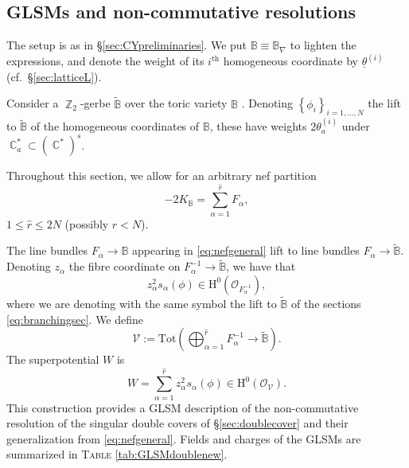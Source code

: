 \documentclass[12pt,a4paper,oneside]{amsart}
\numberwithin{equation}{section}
\theoremstyle{definition}
\theoremstyle{remark}
\DeclareMathOperator{\C}{\mathbb{C}}
\DeclareMathOperator{\Z}{\mathbb{Z}}
\newcommand{\cB}{\mathbb{B}}
\newcommand{\mV}{\mathcal{V}}
\begin{document}
\subsection{GLSMs and non-commutative resolutions}
\label{sec:GLSMnc}
The setup is as in \S\ref{sec:CYpreliminaries}. We put $\cB\equiv \cB_{\nabla}$ to lighten the expressions, and denote the weight of its $i^{\text{th}}$ homogeneous coordinate \cite{Cox:1993fz} by $\underline{\theta}^{(i)}$ (cf.~\S\ref{sec:latticeL}).\par 
Consider a $\Z_2$-gerbe $\widetilde{\cB}$ over the toric variety $\cB$ \cite{Pantev:2005zs}. Denoting $\left\{ \phi_i \right\}_{i=1, \dots, N}$ the lift to $\widetilde{\cB}$ of the homogeneous coordinates of $\cB$, these have weights $2\theta^{(i)}_a$ under $\C^{\ast}_a \subset (\C^{\ast})^s$.\par 
Throughout this section, we allow for an arbitrary nef partition 
\begin{equation}
\label{eq:nefgeneral}
    -2 K_{\cB} = \sum_{\alpha=1}^{\hat{r}} F_{\alpha} ,
\end{equation}
$1 \le \hat{r} \le 2N$ (possibly $\hat{r}<N$).\par
The line bundles $F_{\alpha} \longrightarrow \cB$ appearing in \eqref{eq:nefgeneral} lift to line bundles $F_{\alpha} \longrightarrow \widetilde{\cB}$. 
Denoting $z_{\alpha}$ the fibre coordinate on $F_{\alpha}^{-1} \longrightarrow \widetilde{\cB}$, we have that 
\begin{equation*}
	z_{\alpha}^2 s_{\alpha} (\phi) \in \mathrm{H}^0 (\mathcal{O}_{F_{\alpha}^{-1}}) ,
\end{equation*}
where we are denoting with the same symbol the lift to $\widetilde{\cB}$ of the sections \eqref{eq:branchingsec}. We define 
\begin{equation}\label{eq:bundletilde}
	\mV := \mathrm{Tot} \left( \bigoplus_{\alpha=1}^{\hat{r}} F_{\alpha}^{-1}  \longrightarrow \widetilde{\cB} \right) .
\end{equation}
The superpotential $W$ is \cite{Lee:2023piu}
\begin{equation*}
	W= \sum_{\alpha=1}^{\hat{r}} z_{\alpha}^2 s_{\alpha} (\phi)\in \mathrm{H}^{0}(\mathcal{O}_{\mathcal{V}}).
\end{equation*}
This construction provides a GLSM description of the non-commutative resolution of the singular double covers of \S\ref{sec:doublecover} \cite{Caldararu:2010ljp} and their generalization from \eqref{eq:nefgeneral}. Fields and charges of the GLSMs are summarized in \textsc{Table} \ref{tab:GLSMdoublenew}.\par
\end{document}
